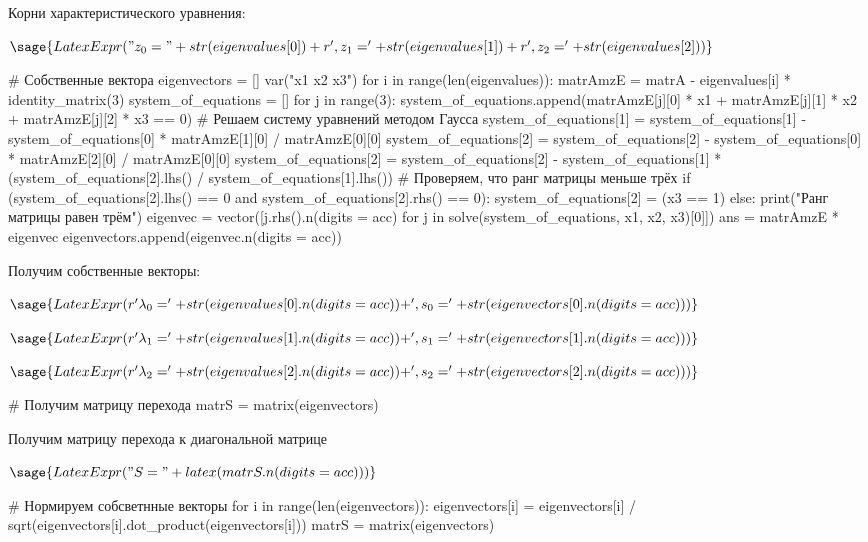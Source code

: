 Корни характеристического уравнения:

$\sage{LatexExpr("z_0 = " + str(eigenvalues[0]) + r', z_1 = ' + str(eigenvalues[1]) + r', z_2 = ' + str(eigenvalues[2]))}$

\begin{sagesilent}
    # Собственные вектора
    eigenvectors = []
    var("x1 x2 x3")
    for i in range(len(eigenvalues)):
        matrAmzE = matrA - eigenvalues[i] * identity_matrix(3)
        system_of_equations = []
        for j in range(3):
            system_of_equations.append(matrAmzE[j][0] * x1 + matrAmzE[j][1] * x2 + matrAmzE[j][2] * x3 == 0)
        # Решаем систему уравнений методом Гаусса
        system_of_equations[1] = system_of_equations[1] - system_of_equations[0] * matrAmzE[1][0] / matrAmzE[0][0]
        system_of_equations[2] = system_of_equations[2] - system_of_equations[0] * matrAmzE[2][0] / matrAmzE[0][0]
        system_of_equations[2] = system_of_equations[2] - system_of_equations[1] * (system_of_equations[2].lhs() / system_of_equations[1].lhs())
        # Проверяем, что ранг матрицы меньше трёх
        if (system_of_equations[2].lhs() == 0 and system_of_equations[2].rhs() == 0):
            system_of_equations[2] = (x3 == 1)
        else:
            print("Ранг матрицы равен трём")
        eigenvec = vector([j.rhs().n(digits = acc) for j in solve(system_of_equations, x1, x2, x3)[0]])
        ans = matrAmzE * eigenvec
        eigenvectors.append(eigenvec.n(digits = acc))
\end{sagesilent}

Получим собственные векторы:

$\sage{LatexExpr(r'\lambda_0 = ' + str(eigenvalues[0].n(digits = acc)) + ', s_0 = ' + str(eigenvectors[0].n(digits = acc)))}$

$\sage{LatexExpr(r'\lambda_1 = ' + str(eigenvalues[1].n(digits = acc)) + ', s_1 = ' + str(eigenvectors[1].n(digits = acc)))}$

$\sage{LatexExpr(r'\lambda_2 = ' + str(eigenvalues[2].n(digits = acc)) + ', s_2 = ' + str(eigenvectors[2].n(digits = acc)))}$

\begin{sagesilent}
    # Получим матрицу перехода
    matrS = matrix(eigenvectors)
\end{sagesilent}

Получим матрицу перехода к диагональной матрице

$\sage{LatexExpr("S = " + latex(matrS.n(digits = acc)))}$

\begin{sagesilent}
    # Нормируем собсветнные векторы
    for i in range(len(eigenvectors)):
        eigenvectors[i] = eigenvectors[i] / sqrt(eigenvectors[i].dot_product(eigenvectors[i]))
    matrS = matrix(eigenvectors)
\end{sagesilent}

